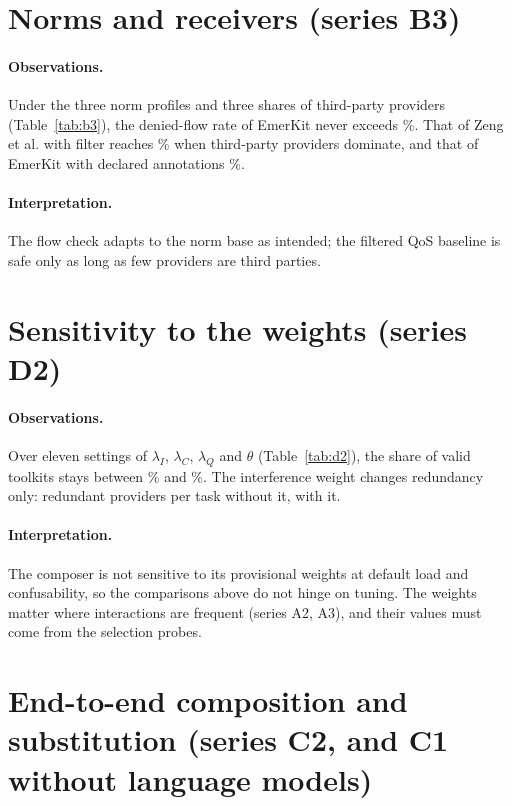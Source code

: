 \documentclass[10pt]{article}
\begin{document}
\section{Norms and receivers (series B3)}
\paragraph{Observations.} Under the three norm profiles and three shares of third-party providers (Table~\ref{tab:b3}), the denied-flow rate of EmerKit never exceeds \RBthreeEmkMax\%. That of Zeng et al. with filter reaches \RBthreeZengHigh\% when third-party providers dominate, and that of EmerKit with declared annotations \RBthreeDeclMax\%.
\paragraph{Interpretation.} The flow check adapts to the norm base as intended; the filtered QoS baseline is safe only as long as few providers are third parties.

\section{Sensitivity to the weights (series D2)}
\paragraph{Observations.} Over eleven settings of $\lambda_I$, $\lambda_C$, $\lambda_Q$ and $\theta$ (Table~\ref{tab:d2}), the share of valid toolkits stays between \RDtwoValidMin\% and \RDtwoValidMax\%. The interference weight changes redundancy only: \RDtwoRedNoI{} redundant providers per task without it, \RDtwoRedI{} with it.
\paragraph{Interpretation.} The composer is not sensitive to its provisional weights at default load and confusability, so the comparisons above do not hinge on tuning. The weights matter where interactions are frequent (series A2, A3), and their values must come from the selection probes.

\section{End-to-end composition and substitution (series C2, and C1 without language models)}
\end{document}
